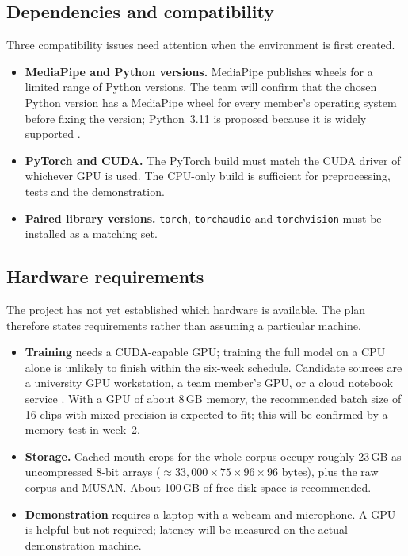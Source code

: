 \subsection{Dependencies and compatibility}
Three compatibility issues need attention when the environment is first
created.
\begin{itemize}
  \item \textbf{MediaPipe and Python versions.} MediaPipe publishes wheels for a
        limited range of Python versions. The team will confirm that the
        chosen Python version has a MediaPipe wheel for every member's
        operating system before fixing the version; Python~3.11 is proposed
        because it is widely supported \tbd.
  \item \textbf{PyTorch and CUDA.} The PyTorch build must match the CUDA driver
        of whichever GPU is used. The CPU-only build is sufficient for
        preprocessing, tests and the demonstration.
  \item \textbf{Paired library versions.} \texttt{torch}, \texttt{torchaudio}
        and \texttt{torchvision} must be installed as a matching set.
\end{itemize}

\subsection{Hardware requirements}
The project has not yet established which hardware is available. The plan
therefore states requirements rather than assuming a particular machine.
\begin{itemize}
  \item \textbf{Training} needs a CUDA-capable GPU; training the full model on a
        CPU alone is unlikely to finish within the six-week schedule. Candidate
        sources are a university GPU workstation, a team member's GPU, or a
        cloud notebook service \tbd. With a GPU of about 8\,GB memory, the
        recommended batch size of 16 clips with mixed precision is expected to
        fit; this will be confirmed by a memory test in week~2.
  \item \textbf{Storage.} Cached mouth crops for the whole corpus occupy roughly
        23\,GB as uncompressed 8-bit arrays
        ($\approx 33{,}000 \times 75 \times 96 \times 96$ bytes), plus the raw
        corpus and MUSAN. About 100\,GB of free disk space is recommended.
  \item \textbf{Demonstration} requires a laptop with a webcam and microphone. A
        GPU is helpful but not required; latency will be measured on the actual
        demonstration machine.
\end{itemize}

